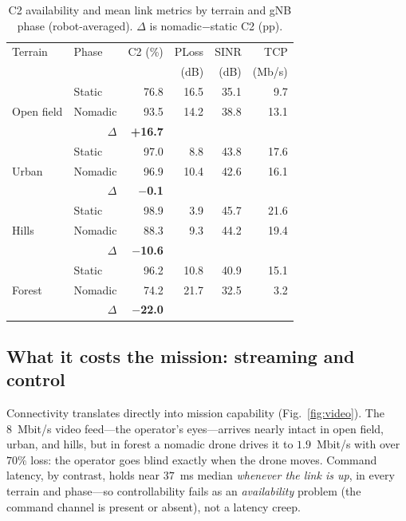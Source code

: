 \documentclass[10pt, conference]{IEEEtran}
\begin{document}
\begin{table}[t]
\centering
\caption{C2 availability and mean link metrics by terrain and gNB phase
(robot-averaged). $\Delta$ is nomadic$-$static C2 (pp).}
\label{tab:main}
\footnotesize
\begin{tabular}{@{}llrrrr@{}}
\toprule
Terrain & Phase & C2 (\%) & PLoss & SINR & TCP \\
        &       &         & (dB)  & (dB) & (Mb/s) \\
\midrule
\multirow{3}{*}{Open field}
 & Static  & 76.8 & 16.5 & 35.1 & 9.7  \\
 & Nomadic & 93.5 & 14.2 & 38.8 & 13.1 \\
 & \multicolumn{1}{r}{$\Delta$} & \textbf{+16.7} & & & \\
\midrule
\multirow{3}{*}{Urban}
 & Static  & 97.0 & 8.8  & 43.8 & 17.6 \\
 & Nomadic & 96.9 & 10.4 & 42.6 & 16.1 \\
 & \multicolumn{1}{r}{$\Delta$} & \textbf{$-$0.1} & & & \\
\midrule
\multirow{3}{*}{Hills}
 & Static  & 98.9 & 3.9  & 45.7 & 21.6 \\
 & Nomadic & 88.3 & 9.3  & 44.2 & 19.4 \\
 & \multicolumn{1}{r}{$\Delta$} & \textbf{$-$10.6} & & & \\
\midrule
\multirow{3}{*}{Forest}
 & Static  & 96.2 & 10.8 & 40.9 & 15.1 \\
 & Nomadic & 74.2 & 21.7 & 32.5 & 3.2  \\
 & \multicolumn{1}{r}{$\Delta$} & \textbf{$-$22.0} & & & \\
\bottomrule
\end{tabular}
\end{table}

\subsection{What it costs the mission: streaming and control}
Connectivity translates directly into mission capability (Fig.~\ref{fig:video}). The
8~Mbit/s video feed---the operator's eyes---arrives nearly intact in open field,
urban, and hills, but in forest a nomadic drone drives it to $1.9$~Mbit/s with over
$70\%$ loss: the operator goes blind exactly when the drone moves. Command latency,
by contrast, holds near $37$~ms median \emph{whenever the link is up}, in every
terrain and phase---so controllability fails as an \emph{availability} problem (the
command channel is present or absent), not a latency creep.
\end{document}
